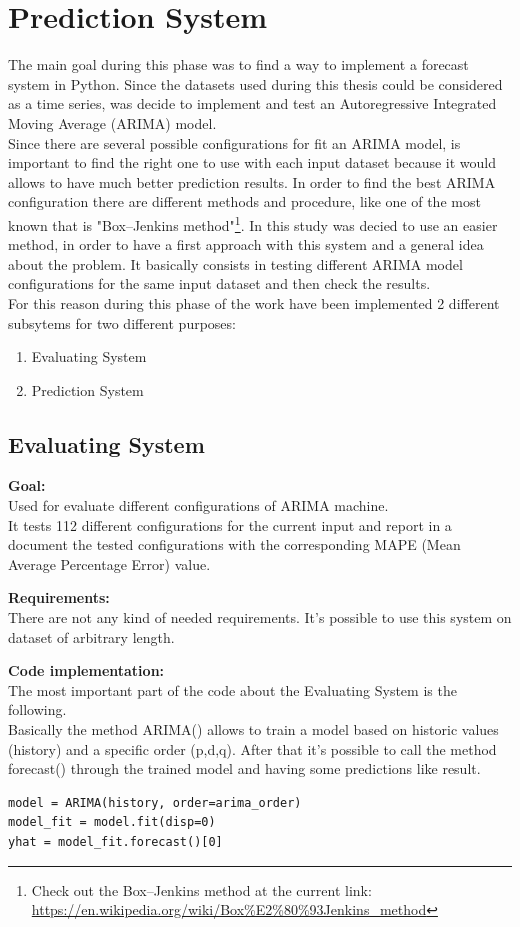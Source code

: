\chapter{Prediction System}
The main goal during this phase was to find a way to implement a forecast system in Python.
Since the datasets used during this thesis could be considered as a time series, was decide to implement and test an Autoregressive Integrated Moving Average (ARIMA) model. \\
Since there are several possible configurations for fit an ARIMA model, is important to find the right one to use with each input dataset because it would allows to have much better prediction results.
In order to find the best ARIMA configuration there are different methods and procedure, like one of the most known that is "Box–Jenkins method"\footnote{Check out the Box–Jenkins method at the current link: \\ \url{https://en.wikipedia.org/wiki/Box\%E2\%80\%93Jenkins_method}}. In this study was decied to use an easier method, in order to have a first approach with this system and a general idea about the problem. It basically consists in testing different ARIMA model configurations for the same input dataset and then check the results.\\
For this reason during this phase of the work have been implemented 2 different subsytems for two different purposes:
\begin{enumerate}
\item Evaluating System
\item Prediction System
\end{enumerate}

\newpage
\section{Evaluating System}
\textbf{Goal:}\\ 
Used for evaluate different configurations of ARIMA machine. \\ It tests 112 different configurations for the current input and report in a document the tested configurations with the corresponding MAPE (Mean Average Percentage Error) value.

\textbf{Requirements:}\\
There are not any kind of needed requirements. It's possible to use this system on dataset of arbitrary length.

\textbf{Code implementation:}\\
The most important part of the code about the Evaluating System is the following.\\
Basically the method ARIMA() allows to train a model based on historic values (history) and a specific order (p,d,q). After that it's possible to call the method forecast() through the trained model and having some predictions like result.
\begin{lstlisting}
model = ARIMA(history, order=arima_order)
model_fit = model.fit(disp=0)
yhat = model_fit.forecast()[0]
\end{lstlisting}

